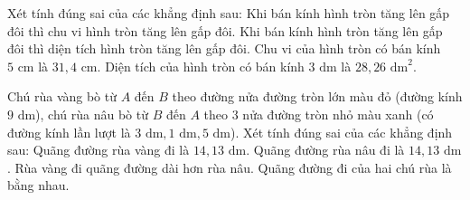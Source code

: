 \begin{ex} %
Xét tính đúng sai của các khẳng định sau:
\choiceTF
{\True Khi bán kính hình tròn tăng lên gấp đôi thì chu vi hình tròn tăng lên gấp đôi.}
{Khi bán kính hình tròn tăng lên gấp đôi thì diện tích hình tròn tăng lên gấp đôi.}
{\True Chu vi của hình tròn có bán kính $5\text{ cm}$ là $31{,}4\text{ cm}$.}
{\True Diện tích của hình tròn có bán kính $3\text{ dm}$ là $28{,}26\text{ dm}^2$.}
\end{ex}

\begin{ex} %
Chú rùa vàng bò từ $A$ đến $B$ theo đường nửa đường tròn lớn màu đỏ (đường kính $9\text{ dm}$), chú rùa nâu bò từ $B$ đến $A$ theo $3$ nửa đường tròn nhỏ màu xanh (có đường kính lần lượt là $3\text{ dm}, 1\text{ dm}, 5\text{ dm}$). Xét tính đúng sai của các khẳng định sau:
\choiceTF
{\True Quãng đường rùa vàng đi là $14{,}13\text{ dm}$.}
{\True Quãng đường rùa nâu đi là $14{,}13\text{ dm}$.}
{Rùa vàng đi quãng đường dài hơn rùa nâu.}
{\True Quãng đường đi của hai chú rùa là bằng nhau.}
\end{ex}

